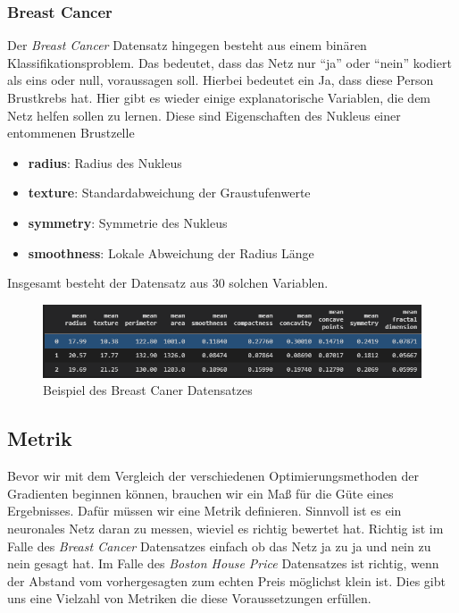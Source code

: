 \subsubsection{Breast Cancer} \label{Breast Cancer}

Der \textit{Breast Cancer} Datensatz hingegen besteht aus einem binären Klassifikationsproblem.
Das bedeutet, dass das Netz nur ``ja'' oder ``nein'' kodiert als eins oder null, voraussagen
soll. Hierbei bedeutet ein Ja, dass diese Person Brustkrebs hat. Hier gibt es 
wieder einige explanatorische Variablen, die dem Netz helfen sollen zu lernen.
Diese sind Eigenschaften des Nukleus einer entommenen Brustzelle


\begin{itemize}
    \item \textbf{radius}: Radius des Nukleus
    \item \textbf{texture}: Standardabweichung der Graustufenwerte
    \item \textbf{symmetry}: Symmetrie des Nukleus
    \item \textbf{smoothness}: Lokale Abweichung der Radius Länge
\end{itemize}

Insgesamt besteht der Datensatz aus 30 solchen Variablen.

\begin{figure}[htbp] 
    \centering
       \includegraphics[width=1.0\textwidth]{abb/BreastCancerBeispiel.PNG}
    \caption{Beispiel des Breast Caner Datensatzes}
    \label{fig:Bild1}
\end{figure}

\subsection{Metrik} \label{Metrik}

Bevor wir mit dem Vergleich der verschiedenen Optimierungsmethoden der Gradienten
beginnen können, brauchen wir ein Maß für die Güte eines Ergebnisses. 
Dafür müssen wir eine Metrik definieren. Sinnvoll ist es ein neuronales Netz
daran zu messen, wieviel es richtig bewertet hat. Richtig ist im Falle des \textit{Breast Cancer}
Datensatzes einfach ob das Netz ja zu ja und nein zu nein gesagt hat. Im Falle 
des \textit{Boston House Price} Datensatzes ist richtig, wenn der Abstand vom
vorhergesagten zum echten Preis möglichst klein ist. Dies gibt uns eine 
Vielzahl von Metriken die diese Voraussetzungen erfüllen.\\

